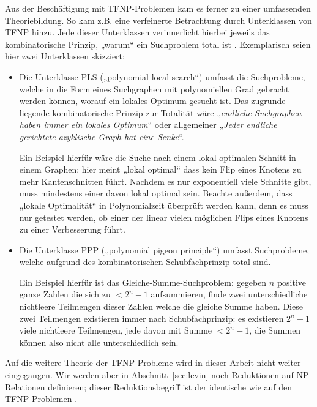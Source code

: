 Aus der Beschäftigung mit TFNP-Problemen kam es ferner zu einer umfassenden Theoriebildung. So kam z.B. eine verfeinerte Betrachtung durch Unterklassen von TFNP hinzu. Jede dieser Unterklassen verinnerlicht hierbei jeweils das kombinatorische Prinzip, „warum“ ein Suchproblem total ist \parencite[vgl. den Überblick von][]{goldberg_towards_2018}. Exemplarisch seien hier zwei Unterklassen skizziert:
\begin{itemize}
    \item Die Unterklasse PLS („polynomial local search“) umfasst die Suchprobleme, welche in die Form eines Suchgraphen mit polynomiellen Grad gebracht werden können, worauf ein lokales Optimum gesucht ist.
        Das zugrunde liegende kombinatorische Prinzip zur Totalität wäre „\emph{endliche Suchgraphen haben immer ein lokales Optimum}“ oder allgemeiner „\emph{Jeder endliche gerichtete azyklische Graph hat eine Senke}“.

        Ein Beispiel hierfür wäre die Suche nach einem lokal optimalen Schnitt in einem Graphen; hier meint „lokal optimal“ dass kein Flip eines Knotens zu mehr Kantenschnitten führt. Nachdem es nur exponentiell viele Schnitte gibt, muss mindestens einer davon lokal optimal sein. Beachte außerdem, dass „lokale Optimalität“ in Polynomialzeit überprüft werden kann, denn es muss nur getestet werden, ob einer der linear vielen möglichen Flips eines Knotens zu einer Verbesserung führt.

    \item Die Unterklasse PPP („polynomial pigeon principle“) umfasst Suchprobleme, welche aufgrund des kombinatorischen Schubfachprinzip total sind. 

        Ein Beispiel hierfür ist das Gleiche-Summe-Suchproblem: gegeben $n$ positive ganze Zahlen die sich zu $<2^n-1$ aufsummieren, finde zwei unterschiedliche nichtleere Teilmengen dieser Zahlen welche die gleiche Summe haben. Diese zwei Teilmengen existieren immer nach Schubfachprinzip: es existieren $2^n-1$ viele nichtleere Teilmengen, jede davon mit Summe $<2^n-1$, die Summen können also nicht alle unterschiedlich sein.
\end{itemize}
Auf die weitere Theorie der TFNP-Probleme wird in dieser Arbeit nicht weiter eingegangen. Wir werden aber in Abschnitt~\ref{sec:levin} noch Reduktionen auf NP-Relationen definieren; dieser Reduktionsbegriff ist der identische wie auf den TFNP-Problemen \parencite{megiddo_total_1991}.



